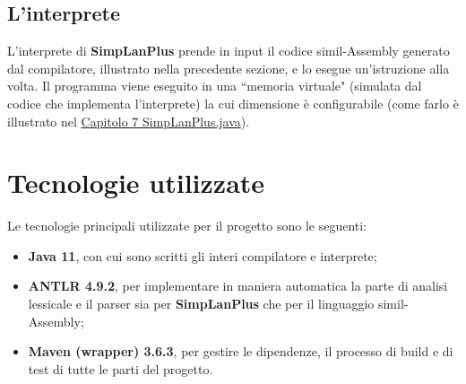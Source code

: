 \documentclass[../report.tex]{subfiles}
\begin{document}
\subsection{L'interprete}\label{ss:interprete}
L'interprete di \textbf{SimpLanPlus} prende in input il codice simil-Assembly generato dal compilatore, illustrato nella precedente sezione, e lo esegue un'istruzione alla volta.
Il programma viene eseguito in una ``memoria virtuale" (simulata dal codice che implementa l'interprete) la cui dimensione è configurabile (come farlo è illustrato nel \hyperref[c:simplanplus-java]{Capitolo 7 SimpLanPlus.java}).

\section{Tecnologie utilizzate}\label{s:teconologie-utilizzate}
Le tecnologie principali utilizzate per il progetto sono le seguenti:
\begin{itemize}
    \item \textbf{Java 11}, con cui sono scritti gli interi compilatore e interprete;
    \item \textbf{ANTLR 4.9.2}, per implementare in maniera automatica la parte di analisi lessicale e il parser sia per \textbf{SimpLanPlus} che per il linguaggio simil-Assembly;
    \item \textbf{Maven (wrapper) 3.6.3}, per gestire le dipendenze, il processo di build e di test di tutte le parti del progetto.
\end{itemize}
\end{document}
